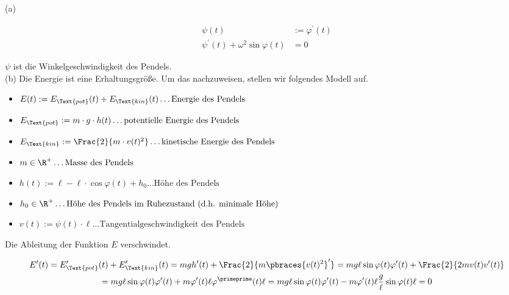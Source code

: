 \begin{solution}

(a)

\begin{align*}
  \psi(t) & := \varphi^\prime(t) \\
  \psi^\prime(t) + \omega^2 \sin{\varphi(t)} & = 0
\end{align*}

% 

$\psi$ ist die Winkelgeschwindigkeit des Pendels. \\

(b) Die Energie ist eine Erhaltungsgröße. Um das nachzuweisen, stellen wir folgendes Modell auf.

\begin{itemize}
  \item
  $E(t) := E_\Text{pot}(t) + E_\Text{kin}(t)
  \ldots \text{Energie des Pendels}$
  \item
  $E_\Text{pot} := m \cdot g \cdot h(t)
  \ldots \text{potentielle Energie des Pendels}$
  \item
  $E_\Text{kin} := \Frac{2}{m \cdot v(t)^2}
  \ldots \text{kinetische Energie des Pendels}$
  \item
  $m \in \R^+
  \ldots \text{Masse des Pendels}$
  \item
  $h(t) := \ell - \ell \cdot \cos{\varphi(t)} + h_0
  \ldots \text{Höhe des Pendels}$
  \item
  $h_0 \in \R^+
  \ldots \text{Höhe des Pendels im Ruhezustand (d.h. minimale Höhe)}$
  \item
  $v(t) := \psi(t) \cdot \ell
  \ldots \text{Tangentialgeschwindigkeit des Pendels}$
\end{itemize}

Die Ableitung der Funktion $E$ verschwindet.

\begin{multline*}
  E^\prime(t)
  =
  E_\Text{pot}^\prime(t) + E_\Text{kin}^\prime(t)
  =
  m g h^\prime(t) + \Frac{2}{m \pbraces{v(t)^2}^\prime}
  =
  m g \ell \sin{\varphi(t) \varphi^\prime(t)} +
  \Frac{2}{2 m v(t) v^\prime(t)} \\
  =
  m g \ell \sin{\varphi(t) \varphi^\prime(t)} +
  m \varphi^\prime(t) \ell \varphi^\primeprime(t) \ell
  =
  m g \ell \sin{\varphi(t) \varphi^\prime(t)} -
  m \varphi^\prime(t) \ell \frac{g}{\ell} \sin{\varphi(t)} \ell = 0
\end{multline*}

\end{solution}
